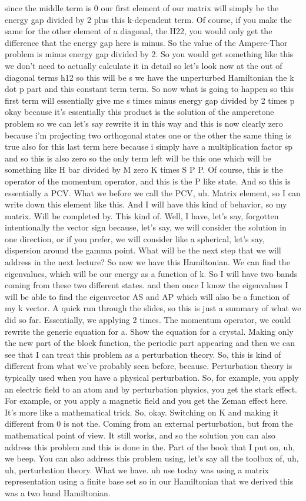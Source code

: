 since the middle term is 0 our first element of our matrix will simply be the energy gap divided by 2 plus this k-dependent term. Of course, if you make the same for the other element of a diagonal, the H22, you would only get the difference that the energy gap here is minus. So the value of the Ampere-Thor problem is minus energy gap divided by 2. So you would get something like this we don't need to actually calculate it in detail so let's look now at the out of diagonal terms h12 so this will be s we have the unperturbed Hamiltonian the k dot p part and this constant term term.
So now what is going to happen so this first term will essentially give me s times minus energy gap divided by 2 times p okay because it's essentially this product is the solution of the amperetone problem so we can let's say rewrite it in this way and this is now clearly zero because i'm projecting two orthogonal states one or the other the same thing is true also for this last term here because i simply have a multiplication factor sp and so this is also zero so the only term left will be this one which will be something like H bar divided by M zero K times S P P. Of course, this is the operator of the momentum operator, and this is the P like state. And so this is essentially a PCV. What we before we call the PCV, uh. Matrix element, so I can write down this element like this. And I will have this kind of behavior, so my matrix. Will be completed by. This kind of. Well, I have, let's say, forgotten intentionally the vector sign because, let's say, we will consider the solution in one direction, or if you prefer, we will consider like a spherical, let's say, dispersion around the gamma point. What will be the next step that we will address in the next lecture? So now we have this Hamiltonian. We can find the eigenvalues, which will be our energy as a function of k. So I will have two bands coming from these two different states. and then once I know the eigenvalues I will be able to find the eigenvector AS and AP which will also be a function of my k vector. A quick run through the slides, so this is just a summary of what we did so far. Essentially, we applying 2 times. The momentum operator, we could rewrite the generic equation for a. Show the equation for a crystal. Making only the new part of the block function, the periodic part appearing and then we can see that I can treat this problem as a perturbation theory. So, this is kind of different from what we've probably seen before, because. Perturbation theory is typically used when you have a physical perturbation. So, for example, you apply an electric field to an atom and by perturbation physics, you get the stark effect. For example, or you apply a magnetic field and you get the Zeman effect here. It's more like a mathematical trick. So, okay. Switching on K and making it different from 0 is not the. Coming from an external perturbation, but from the mathematical point of view. It still works, and so the solution you can also address this problem and this is done in the. Part of the book that I put on, uh, we beep. You can also address this problem using, let's say all the toolbox of, uh, uh, perturbation theory. What we have. uh use today was using a matrix representation using a finite base set so in our Hamiltonian that we derived this was a two band Hamiltonian.
